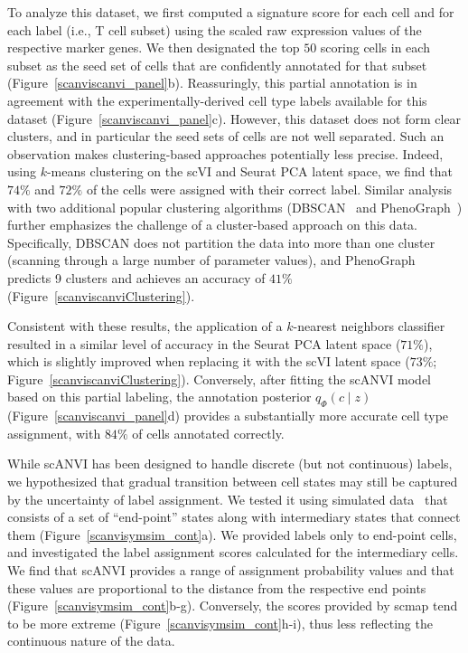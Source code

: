 To analyze this dataset, we first computed a signature score for each cell and for each label (i.e., T cell subset) using the scaled raw expression values of the respective marker genes. We then designated the top $50$ scoring cells in each subset as the seed set of cells that are confidently annotated for that subset (Figure~\ref{scanviscanvi_panel}b). Reassuringly, this partial annotation is in agreement with the experimentally-derived cell type labels available for this dataset (Figure~\ref{scanviscanvi_panel}c). However, this dataset does not form clear clusters, and in particular the seed sets of cells are not well separated. Such an observation makes clustering-based approaches potentially less precise. Indeed, using $k$-means clustering on the scVI and Seurat PCA latent space, we find that $74 \%$ and $72\%$ of the cells were assigned with their correct label. Similar analysis with two additional popular clustering algorithms (DBSCAN~\cite{dbscan} and PhenoGraph~\cite{Levine_PhenoGraph_2015}) further emphasizes the challenge of a cluster-based approach on this data. Specifically, DBSCAN does not partition the data into more than one cluster (scanning through a large number of parameter values), and PhenoGraph predicts 9 clusters and achieves an accuracy of $41 \%$ (Figure~\ref{scanviscanviClustering}). 


Consistent with these results, the application of a $k$-nearest neighbors classifier resulted in a similar level of accuracy in the Seurat PCA latent space ($71 \%$), which is slightly improved when replacing it with the scVI latent space ($73 \%$; Figure~\ref{scanviscanviClustering}). Conversely, after fitting the scANVI model based on this partial labeling, the annotation posterior $q_\Phi(c \mid z)$ (Figure~\ref{scanviscanvi_panel}d) provides a substantially more accurate cell type assignment, with $84 \%$ of cells annotated correctly. 

While scANVI has been designed to handle discrete (but not continuous) labels, we hypothesized that gradual transition between cell states may still be captured by the uncertainty of label assignment. We tested it using simulated data~\cite{symsim} that consists of a set of ``end-point'' states along with intermediary states that connect them (Figure~\ref{scanvisymsim_cont}a). We provided labels only to end-point cells, and investigated the label assignment scores calculated for the intermediary cells. We find that scANVI provides a range of assignment probability values and that these values are proportional to the distance from the respective end points (Figure~\ref{scanvisymsim_cont}b-g). Conversely, the scores provided by scmap tend to be more extreme (Figure~\ref{scanvisymsim_cont}h-i), thus less reflecting the continuous nature of the data.



